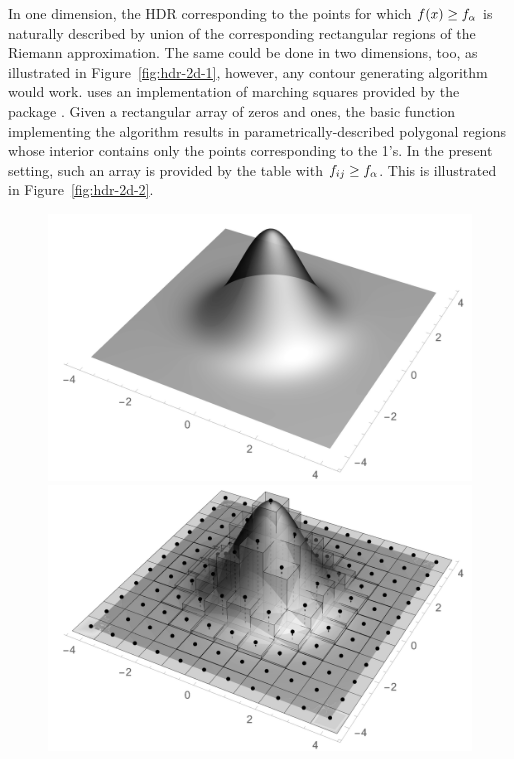 In one dimension, the HDR corresponding to the points for which $f(x) \geq f_{\alpha}$ is naturally described by union of the corresponding rectangular regions of the Riemann approximation. The same could be done in two dimensions, too, as illustrated in Figure~\ref{fig:hdr-2d-1}, however, any contour generating algorithm would work.  uses an implementation of marching squares provided by the  package \citep{isoband}. Given a rectangular array of zeros and ones, the basic function implementing the algorithm results in parametrically-described polygonal regions whose interior contains only the points corresponding to the 1's. In the present setting, such an array is provided by the table with $f_{ij} \geq f_{\alpha}$. This is illustrated in Figure~\ref{fig:hdr-2d-2}.


\begin{figure}[h!]%
  \centering
  \includegraphics[scale=.3]{figures/hist-1.pdf}
  \includegraphics[scale=.3]{figures/hist-2.pdf} \\

\end{figure}
